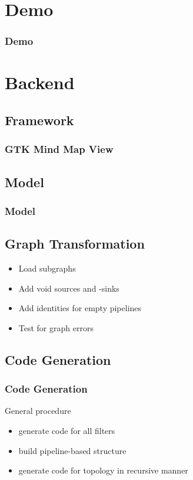 \documentclass{beamer}
\begin{document}
\section{Demo}
\begin{frame}
\frametitle{Demo}
\end{frame}


\section{Backend}

\subsection{Framework}
\begin{frame}
\frametitle{GTK Mind Map View}
\end{frame}


\subsection{Model}
\begin{frame}
\frametitle{Model}
\end{frame}

\subsection{Graph Transformation}
\begin{frame}
	\begin{itemize}
		\item Load subgraphs
		\item Add void sources and -sinks
		\item Add identities for empty pipelines
		\item Test for graph errors %
	\end{itemize}
\end{frame}

\subsection{Code Generation}
\begin{frame}
\frametitle{Code Generation}
	\begin{block}{General procedure}
		\begin{itemize}
			\item generate code for all filters
			\item build pipeline-based structure
			\item generate code for topology in recursive manner
		\end{itemize}
	\end{block}

\end{frame}
\end{document}

